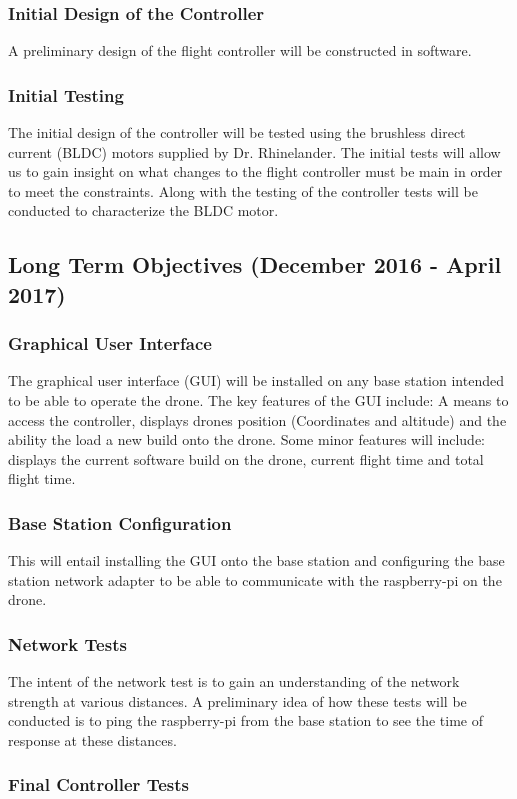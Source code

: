 \subsubsection{Initial Design of the Controller} 
A preliminary design of the flight controller will be constructed in software. 

\subsubsection{Initial Testing} 
The initial design of the controller will be tested using the brushless direct current (BLDC) motors  supplied by Dr. Rhinelander. The initial tests will allow us to gain insight on what changes to the flight controller must be main in order to meet the constraints. Along with the testing of the controller tests will be conducted to characterize the BLDC motor. 

\subsection{Long Term Objectives (December 2016 - April 2017)}
\subsubsection{Graphical User Interface}
The graphical user interface (GUI) will be installed on any base station intended to be able to operate the drone. The key features of the GUI include: A means to access the controller, displays drones position (Coordinates and altitude) and the ability the load a new build onto the drone. Some minor features will include: displays the current software build on the drone, current flight time and total flight time.
 
\subsubsection{Base Station Configuration}
This will entail installing the GUI onto the base station and configuring the base station network adapter to be able to communicate with the raspberry-pi on the drone. 

\subsubsection{Network Tests}
The intent of the network test is to gain an understanding of the network strength at various distances. A preliminary idea of how these tests will be conducted is to ping the raspberry-pi from the base station to see the time of response at these distances. 

\subsubsection{Final Controller Tests}



	
